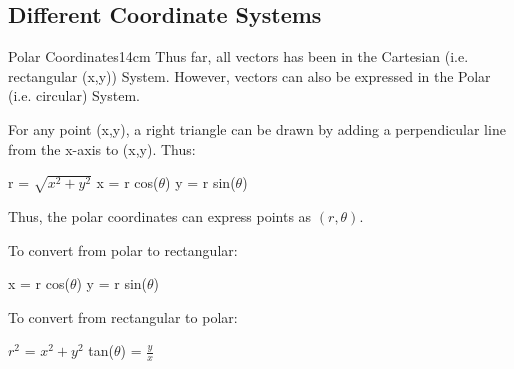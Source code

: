     \vspace{0.5cm}



\subsection{ Different Coordinate Systems }

    \begin{definition}{Polar Coordinates}{14cm}
        Thus far, all vectors has been in the Cartesian
        (i.e. rectangular (x,y)) System.
        However, vectors can also be expressed in the Polar
        (i.e. circular) System.

        \vspace{0.3cm}

        For any point (x,y), a right triangle can be drawn by
        adding a perpendicular line from the x-axis to (x,y).
        Thus:

        \hspace{0.5cm}
        r = $\sqrt{x^2 + y^2}$
        \hspace{1cm}
        x = r cos($\theta$)
        \hspace{1cm}
        y = r sin($\theta$)

        Thus, the {\color{lblue} polar coordinates} can express points
        as $(r,\theta)$.

        \hspace{0.5cm}
        To convert from polar to rectangular:

        \hspace{1cm}
        x = r cos($\theta$)
        \hspace{1cm}
        y = r sin($\theta$)

        \hspace{0.5cm}
        To convert from rectangular to polar:

        \hspace{1cm}
        $r^2$ = $x^2 + y^2$
        \hspace{1cm}
        tan($\theta$) = $\frac{y}{x}$
    \end{definition}

